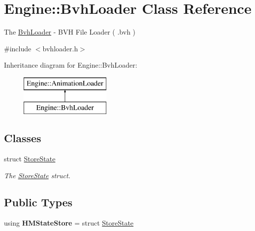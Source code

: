 \hypertarget{classEngine_1_1BvhLoader}{}\section{Engine\+:\+:Bvh\+Loader Class Reference}
\label{classEngine_1_1BvhLoader}


The \hyperlink{classEngine_1_1BvhLoader}{Bvh\+Loader} -\/ B\+V\+H File Loader ( .bvh )  




{\ttfamily \#include $<$bvhloader.\+h$>$}

Inheritance diagram for Engine\+:\+:Bvh\+Loader\+:\begin{figure}[H]
\begin{center}
\leavevmode
\includegraphics[height=2.000000cm]{classEngine_1_1BvhLoader}
\end{center}
\end{figure}
\subsection*{Classes}
\begin{DoxyCompactItemize}
\item 
struct \hyperlink{structEngine_1_1BvhLoader_1_1StoreState}{Store\+State}
\begin{DoxyCompactList}\small\item\em The \hyperlink{structEngine_1_1BvhLoader_1_1StoreState}{Store\+State} struct. \end{DoxyCompactList}\end{DoxyCompactItemize}
\subsection*{Public Types}
\begin{DoxyCompactItemize}
\item 
\hypertarget{classEngine_1_1BvhLoader_aec0215c1beb225aee94b6f57ad13adaf}{}using {\bfseries H\+M\+State\+Store} = struct \hyperlink{structEngine_1_1BvhLoader_1_1StoreState}{Store\+State}\label{classEngine_1_1BvhLoader_aec0215c1beb225aee94b6f57ad13adaf}

\end{DoxyCompactItemize}
